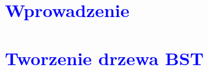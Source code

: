 \documentclass{article}
\begin{document}
	\titleformat{\section}{\Huge\bfseries}{\thesection}{2em}{}
	
	\section*{\textcolor{blue}{Wprowadzenie}}
	
	
	\titleformat{\section}{\Large\bfseries}{\thesection}{2em}{}
	\section*{\textcolor{blue}{Tworzenie drzewa BST}}
\end{document}
